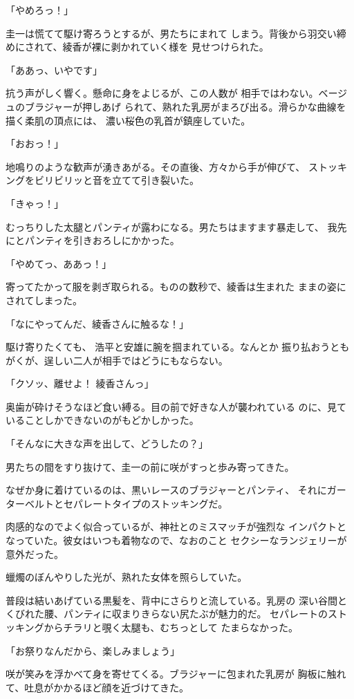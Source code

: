 ﻿\documentclass[
    book,tate,
    line_length=30zw,
    jafontsize=12pt,
    paper=b5j,
    landscape,
    ]{jlreq}
\begin{document}
「やめろっ！」

圭一は慌てて駆け寄ろうとするが、男たちにまれて
しまう。背後から羽交い締めにされて、綾香が裸に剥かれていく様を
見せつけられた。

「ああっ、いやです」

抗う声がしく響く。懸命に身をよじるが、この人数が
相手ではわない。ベージュのブラジャーが押しあげ
られて、熟れた乳房がまろび出る。滑らかな曲線を描く柔肌の頂点には、
濃い桜色の乳首が鎮座していた。

「おおっ！」

地鳴りのような歓声が湧きあがる。その直後、方々から手が伸びて、
ストッキングをビリビリッと音を立てて引き裂いた。

「きゃっ！」

むっちりした太腿とパンティが露わになる。男たちはますます暴走して、
我先にとパンティを引きおろしにかかった。

「やめてっ、ああっ！」

寄ってたかって服を剥ぎ取られる。ものの数秒で、綾香は生まれた
ままの姿にされてしまった。

「なにやってんだ、綾香さんに触るな！」

駆け寄りたくても、 浩平と安雄に腕を掴まれている。なんとか
振り払おうともがくが、逞しい二人が相手ではどうにもならない。

「クソッ、離せよ！ 綾香さんっ」

奥歯が砕けそうなほど食い縛る。目の前で好きな人が襲われている
のに、見ていることしかできないのがもどかしかった。

「そんなに大きな声を出して、どうしたの？」

男たちの間をすり抜けて、圭一の前に咲がすっと歩み寄ってきた。

なぜか身に着けているのは、黒いレースのブラジャーとパンティ、
それにガーターベルトとセパレートタイプのストッキングだ。

肉感的なのでよく似合っているが、神社とのミスマッチが強烈な
インパクトとなっていた。彼女はいつも着物なので、なおのこと
セクシーなランジェリーが意外だった。

蠟燭のぼんやりした光が、熟れた女体を照らしていた。

普段は結いあげている黒髪を、背中にさらりと流している。乳房の
深い谷間とくびれた腰、パンティに収まりきらない尻たぶが魅力的だ。
セパレートのストッキングからチラリと覗く太腿も、むちっとして
たまらなかった。

「お祭りなんだから、楽しみましょう」

咲が笑みを浮かべて身を寄せてくる。ブラジャーに包まれた乳房が
胸板に触れて、吐息がかかるほど顔を近づけてきた。
\end{document}
